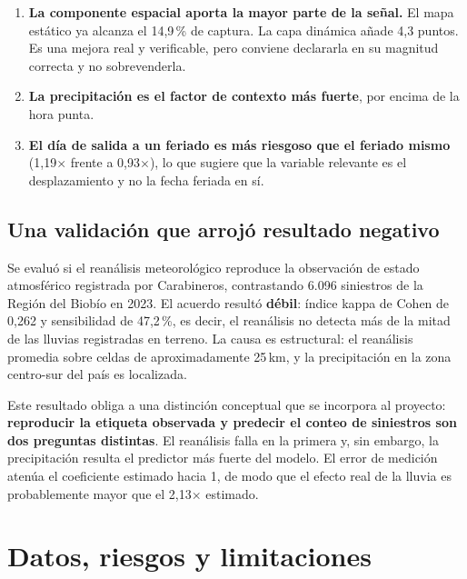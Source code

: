 \documentclass[11pt,a4paper]{article}
\begin{document}
\begin{enumerate}
  \item \textbf{La componente espacial aporta la mayor parte de la señal.} El
  mapa estático ya alcanza el 14,9\,\% de captura. La capa dinámica añade 4,3
  puntos. Es una mejora real y verificable, pero conviene declararla en su
  magnitud correcta y no sobrevenderla.

  \item \textbf{La precipitación es el factor de contexto más fuerte}, por
  encima de la hora punta.

  \item \textbf{El día de salida a un feriado es más riesgoso que el feriado
  mismo} (1,19$\times$ frente a 0,93$\times$), lo que sugiere que la variable
  relevante es el desplazamiento y no la fecha feriada en sí.
\end{enumerate}

\subsection{Una validación que arrojó resultado negativo}

Se evaluó si el reanálisis meteorológico reproduce la observación de estado
atmosférico registrada por Carabineros, contrastando 6.096 siniestros de la
Región del Biobío en 2023. El acuerdo resultó \textbf{débil}: índice kappa de
Cohen de 0,262 y sensibilidad de 47,2\,\%, es decir, el reanálisis no detecta
más de la mitad de las lluvias registradas en terreno. La causa es estructural:
el reanálisis promedia sobre celdas de aproximadamente 25\,km, y la
precipitación en la zona centro-sur del país es localizada.

Este resultado obliga a una distinción conceptual que se incorpora al proyecto:
\textbf{reproducir la etiqueta observada y predecir el conteo de siniestros son
dos preguntas distintas}. El reanálisis falla en la primera y, sin embargo, la
precipitación resulta el predictor más fuerte del modelo. El error de medición
atenúa el coeficiente estimado hacia 1, de modo que el efecto real de la lluvia
es probablemente mayor que el 2,13$\times$ estimado.

\section{Datos, riesgos y limitaciones}
\label{sec:limitaciones}
\end{document}
